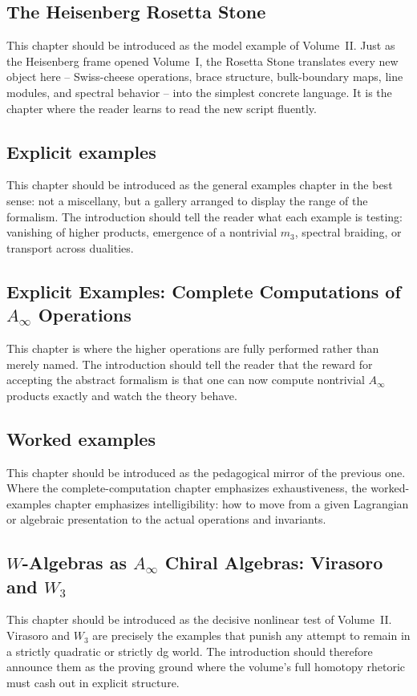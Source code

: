 \subsection*{The Heisenberg Rosetta Stone}
This chapter should be introduced as the model example of Volume~II.  Just as the Heisenberg frame opened Volume~I, the Rosetta Stone translates every new object here -- Swiss-cheese operations, brace structure, bulk-boundary maps, line modules, and spectral behavior -- into the simplest concrete language.  It is the chapter where the reader learns to read the new script fluently.

\subsection*{Explicit examples}
This chapter should be introduced as the general examples chapter in the best sense: not a miscellany, but a gallery arranged to display the range of the formalism.  The introduction should tell the reader what each example is testing: vanishing of higher products, emergence of a nontrivial $m_3$, spectral braiding, or transport across dualities.

\subsection*{Explicit Examples: Complete Computations of $A_\infty$ Operations}
This chapter is where the higher operations are fully performed rather than merely named.  The introduction should tell the reader that the reward for accepting the abstract formalism is that one can now compute nontrivial $A_\infty$ products exactly and watch the theory behave.

\subsection*{Worked examples}
This chapter should be introduced as the pedagogical mirror of the previous one.  Where the complete-computation chapter emphasizes exhaustiveness, the worked-examples chapter emphasizes intelligibility: how to move from a given Lagrangian or algebraic presentation to the actual operations and invariants.

\subsection*{$W$-Algebras as $A_\infty$ Chiral Algebras: Virasoro and $W_3$}
This chapter should be introduced as the decisive nonlinear test of Volume~II.  Virasoro and $W_3$ are precisely the examples that punish any attempt to remain in a strictly quadratic or strictly dg world.  The introduction should therefore announce them as the proving ground where the volume's full homotopy rhetoric must cash out in explicit structure.

